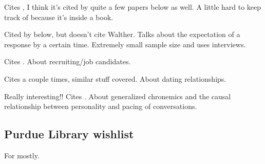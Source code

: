 \documentclass[
]{article}
\begin{document}
\textbf{}

Cites \textcite{walther95}, I think it's cited by quite a few papers
below as well. A little hard to keep track of because it's inside a
book.

\textbf{}

Cited by \textcite{kalman11} below, but doesn't cite Walther. Talks
about the expectation of a response by a certain time. Extremely small
sample size and uses interviews.

\textbf{}

Cites \textcite{walther95}. About recruiting/job candidates.

\textbf{}

Cites \textcite{walther95} a couple times, similar stuff covered. About
dating relationships.

\textbf{}

Really interesting!! Cites \textcite{walther95}. About generalized
chronemics and the causal relationship between personality and pacing of
conversations.

\textbf{}

\hypertarget{purdue-library-wishlist}{%
\subsection{Purdue Library wishlist}\label{purdue-library-wishlist}}


For \textcite{doring09} mostly.

\printbibliography
\end{document}

